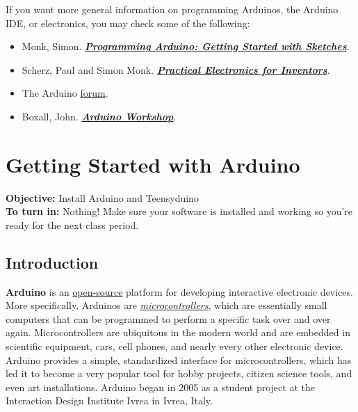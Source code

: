 \documentclass[]{book}
\providecommand{\tightlist}{%
  \setlength{\itemsep}{0pt}\setlength{\parskip}{0pt}}
\begin{document}
If you want more general information on programming Arduinos, the Arduino IDE, or electronics, you may check some of the following:

\begin{itemize}
\tightlist
\item
  Monk, Simon. \href{https://www.amazon.com/Programming-Arduino-Getting-Started-Sketches/dp/0071784225}{\textbf{\emph{Programming Arduino: Getting Started with Sketches}}}.\\
\item
  Scherz, Paul and Simon Monk. \href{https://www.amazon.com/Practical-Electronics-Inventors-Fourth-Scherz/dp/1259587541/ref=pd_lpo_sbs_14_t_0?_encoding=UTF8\&psc=1\&refRID=9JN842FPFMNAA9RQV8X3}{\textbf{\emph{Practical Electronics for Inventors}}}.\\
\item
  The Arduino \href{https://forum.arduino.cc/}{forum}.\\
\item
  Boxall, John. \href{https://www.amazon.com/Arduino-Workshop-Hands-Introduction-Projects/dp/1593274483}{\textbf{\emph{Arduino Workshop}}}.
\end{itemize}

\hypertarget{getting-started-with-arduino}{%
\chapter{Getting Started with Arduino}\label{getting-started-with-arduino}}

\textbf{Objective:} Install Arduino and Teensyduino\\
\textbf{To turn in:} Nothing! Make sure your software is installed and working so you're ready for the next class period.

\hypertarget{introduction}{%
\section*{Introduction}\label{introduction}}

\textbf{Arduino} is an \href{http://www.wikipedia.com/wiki/Open-source}{open-source} platform for developing interactive electronic devices. More specifically, Arduinos are \href{https://en.wikipedia.org/wiki/Microcontroller}{\emph{microcontrollers}}, which are essentially small computers that can be programmed to perform a specific task over and over again. Microcontrollers are ubiquitous in the modern world and are embedded in scientific equipment, cars, cell phones, and nearly every other electronic device. Arduino provides a simple, standardized interface for microcontrollers, which has led it to become a very popular tool for hobby projects, citizen science tools, and even art installations. Arduino began in 2005 as a student project at the Interaction Design Institute Ivrea in Ivrea, Italy.
\end{document}
